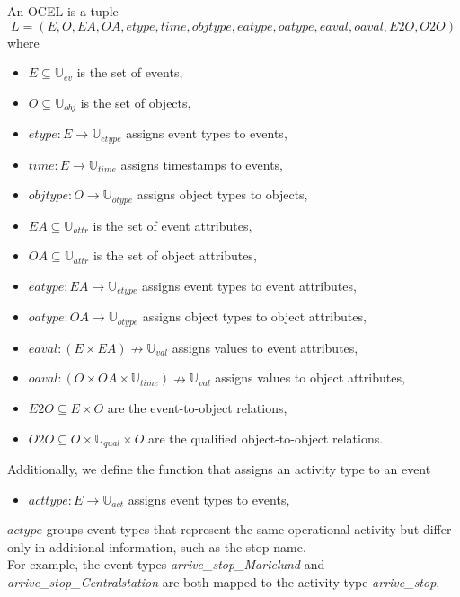 	
	\begin{definition}
    \label{def:def_ocel}
		An OCEL is a tuple
		\[
		L = (E, O, EA, OA, etype, time, objtype, eatype, oatype, eaval, oaval, E2O, O2O)
		\]
		where
		\begin{itemize}[leftmargin=2em]
			\item $E \subseteq \mathbb{U}_{ev}$ is the set of events,
			\item $O \subseteq \mathbb{U}_{obj}$ is the set of objects,
			\item $etype: E \to \mathbb{U}_{etype}$ assigns event types to events,
			\item $time: E \to \mathbb{U}_{time}$ assigns timestamps to events,
			\item $objtype: O \to \mathbb{U}_{otype}$ assigns object types to objects,
			\item $EA \subseteq \mathbb{U}_{attr}$ is the set of event attributes,
			\item $OA \subseteq \mathbb{U}_{attr}$ is the set of object attributes,
			\item $eatype: EA \to \mathbb{U}_{etype}$ assigns event types to event attributes,
			\item $oatype: OA \to \mathbb{U}_{otype}$ assigns object types to object attributes,
			\item $eaval: (E \times EA) \nrightarrow \mathbb{U}_{val}$ assigns values to event attributes,
			\item $oaval: (O \times OA \times \mathbb{U}_{time}) \nrightarrow \mathbb{U}_{val}$ assigns values to object attributes,
			\item $E2O \subseteq E  \times O$ are the event-to-object relations,
			\item $O2O \subseteq O \times \mathbb{U}_{qual} \times O$ are the qualified object-to-object relations.
		\end{itemize}

        Additionally, we define the function that assigns an activity type to an event
	
	\begin{itemize}[leftmargin=2em]
		\item $acttype: E \rightarrow \mathbb{U}_{act}$ assigns event types to events,
	\end{itemize}
	\end{definition}
    
$actype$ groups event types that represent the same operational activity but differ only in additional information, such as the stop name. \\
For example, the event types \textit{arrive\_stop\_Marielund} and \textit{arrive\_stop\_Centralstation} are both mapped to the activity type \textit{arrive\_stop}.


